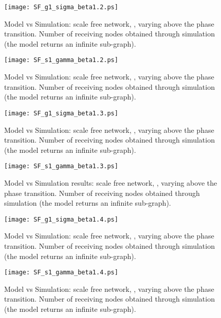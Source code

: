 \documentclass[10pt, conference, compsocconf]{IEEEtran}
\begin{document}
\begin{figure}[t]
   \centering
   \texttt{[image: SF\_g1\_sigma\_beta1.2.ps]}
   \caption{Model vs Simulation: scale free network, , varying  above the phase transition. Number of receiving nodes obtained through simulation (the model returns an infinite sub-graph).}
   \label{fig:SF_confronto_g_beta1.2}
\end{figure}

\begin{figure}[t]
   \centering
   \texttt{[image: SF\_s1\_gamma\_beta1.2.ps]}
   \caption{Model vs Simulation: scale free network, , varying  above the phase transition. Number of receiving nodes obtained through simulation (the model returns an infinite sub-graph).}
   \label{fig:SF_confronto_s_beta1.2}
\end{figure}

\begin{figure}[t]
   \centering
   \texttt{[image: SF\_g1\_sigma\_beta1.3.ps]}
   \caption{Model vs Simulation: scale free network, , varying  above the phase transition. Number of receiving nodes obtained through simulation (the model returns an infinite sub-graph).}
   \label{fig:SF_confronto_g_beta1.3}
\end{figure}

\begin{figure}[t]
   \centering
   \texttt{[image: SF\_s1\_gamma\_beta1.3.ps]}
   \caption{Model vs Simulation results: scale free network, , varying  above the phase transition. Number of receiving nodes obtained through simulation (the model returns an infinite sub-graph).}
   \label{fig:SF_confronto_s_beta1.3}
\end{figure}

\begin{figure}[t]
   \centering
   \texttt{[image: SF\_g1\_sigma\_beta1.4.ps]}
   \caption{Model vs Simulation: scale free network, , varying  above the phase transition. Number of receiving nodes obtained through simulation (the model returns an infinite sub-graph).}
   \label{fig:SF_confronto_g_beta1.4}
\end{figure}

\begin{figure}[t]
   \centering
   \texttt{[image: SF\_s1\_gamma\_beta1.4.ps]}
   \caption{Model vs Simulation: scale free network, , varying  above the phase transition. Number of receiving nodes obtained through simulation (the model returns an infinite sub-graph).}
   \label{fig:SF_confronto_s_beta1.4}
\end{figure}
\end{document}
